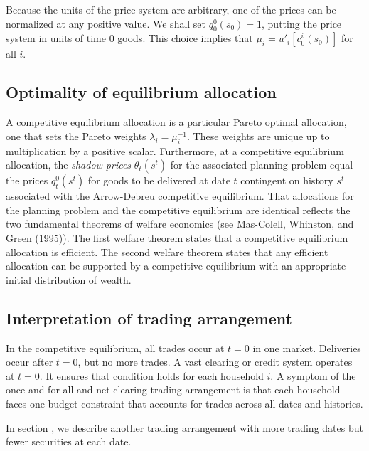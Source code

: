   Because the units of the
price system are arbitrary, one of the prices
can be  normalized
at any positive value.  We shall set $q^0_0(s_0)= 1$,
putting the price system in units of time $0$
  goods. This choice implies that
 $\mu_i  =  u'_i[c_0^i(s_0)] $
for all $i$.



\subsection{Optimality of equilibrium allocation}
  A competitive  equilibrium allocation   is a particular Pareto
optimal allocation, one that sets the Pareto weights $\lambda_i =
\mu_i^{-1}$.  These weights are unique up to multiplication by a positive scalar. Furthermore, at a
competitive equilibrium allocation, the {\it shadow prices\/}
$\theta_t(s^t)$ for the associated planning problem equal the
prices $q_t^0(s^t)$ for goods to be delivered at date $t$
contingent on history $s^t$ associated with the Arrow-Debreu
competitive equilibrium. That  allocations for the planning
problem and the competitive equilibrium are identical reflects the
two fundamental theorems of welfare economics (see Mas-Colell,
Whinston, and Green (1995)).
The first welfare theorem states that a  competitive equilibrium allocation is efficient.
The second welfare theorem states that any efficient allocation can be supported by a competitive equilibrium
with an appropriate initial distribution of wealth.


\subsection{Interpretation of trading arrangement}
  In the  competitive   equilibrium, all trades occur at $t=0$ in
one market.  Deliveries occur after $t=0$, but no more trades.
  A vast clearing or credit system operates at $t=0$.
It ensures that condition  holds for each household
$i$.   A symptom of the once-and-for-all and net-clearing trading arrangement is
that each household faces one  budget constraint that accounts
for  trades across all dates and histories.


  In section , we describe another trading arrangement with
more trading dates but fewer securities at each date. %



